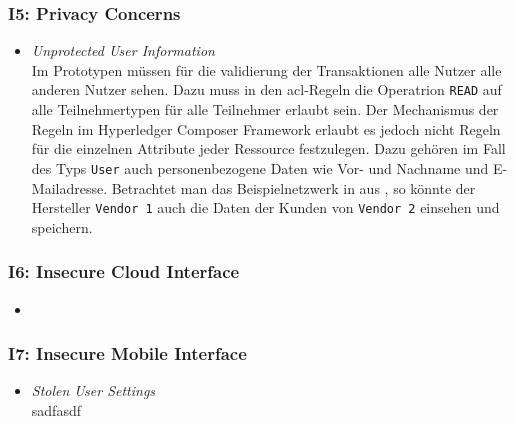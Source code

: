         \subsubsection*{I5: Privacy Concerns}
            \begin{itemize}[leftmargin=0cm,label={}]
                \item \emph{Unprotected User Information}\label{vuln:prototype_userdata}\\
                    Im Prototypen müssen für die validierung der Transaktionen alle Nutzer alle anderen Nutzer sehen. 
                    Dazu muss in den \gls{acl}-Regeln die Operatrion \colorbox{light-gray}{\lstinline{READ}} auf alle Teilnehmertypen für alle Teilnehmer erlaubt sein. 
                    Der Mechanismus der Regeln im Hyperledger Composer Framework erlaubt es jedoch nicht Regeln für die einzelnen Attribute jeder Ressource festzulegen. 
                    Dazu gehören im Fall des Typs \colorbox{light-gray}{\lstinline{User}} auch personenbezogene Daten wie Vor- und Nachname und E-Mailadresse. 
                    Betrachtet man das Beispielnetzwerk in  aus , so könnte der Hersteller \colorbox{light-gray}{\lstinline{Vendor 1}} auch die Daten der Kunden von \colorbox{light-gray}{\lstinline{Vendor 2}} einsehen und speichern.
            \end{itemize}
            
        \subsubsection*{I6: Insecure Cloud Interface}
            \begin{itemize}[leftmargin=0cm,label={}]
                \item 
            \end{itemize}
            
        \subsubsection*{I7: Insecure Mobile Interface}
            \begin{itemize}[leftmargin=0cm,label={}]
                \item \emph{Stolen User Settings}\label{vuln:prototype_usersettings}\\
                    sadfasdf
            \end{itemize}
            
